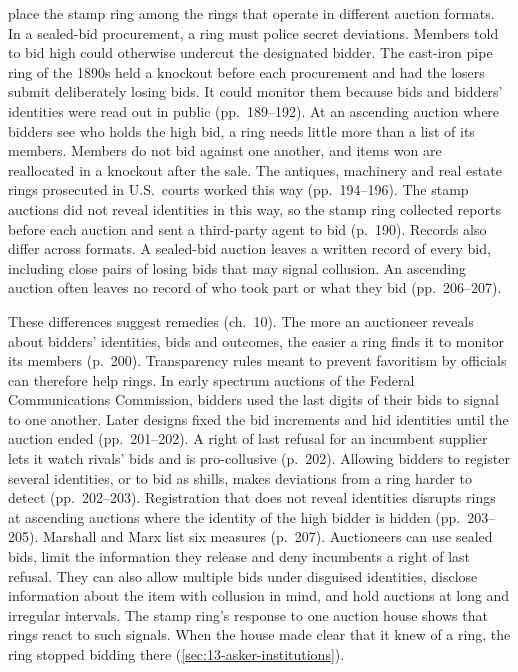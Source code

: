 \citet[chs.~9--10]{MarshallMarx2012} place the stamp ring among the rings that operate in different auction
formats. In a sealed-bid procurement, a ring must police secret deviations. Members told to bid high could
otherwise undercut the designated bidder. The cast-iron pipe ring of the 1890s held a knockout before each
procurement and had the losers submit deliberately losing bids. It could monitor them because bids and bidders'
identities were read out in public (pp.~189--192). At an ascending auction where bidders see who holds the high
bid, a ring needs little more than a list of its members. Members do not bid against one another, and items won are
reallocated in a knockout after the sale. The antiques, machinery and real estate rings prosecuted in U.S.\ courts
worked this way (pp.~194--196). The stamp auctions did not reveal identities in this way, so the stamp ring collected
reports before each auction and sent a third-party agent to bid (p.~190). Records also differ across formats. A
sealed-bid auction leaves a written record of every bid, including close pairs of losing bids that may signal
collusion. An ascending auction often leaves no record of who took part or what they bid (pp.~206--207).

These differences suggest remedies (ch.~10). The more an auctioneer reveals about bidders' identities, bids and
outcomes, the easier a ring finds it to monitor its members (p.~200). Transparency rules meant to prevent
favoritism by officials can therefore help rings. In early spectrum auctions of the Federal Communications
Commission, bidders used the last digits of their bids to signal to one another. Later designs fixed the bid
increments and hid identities until the auction ended (pp.~201--202). A right of last refusal for an incumbent
supplier lets it watch rivals' bids and is pro-collusive (p.~202). Allowing bidders to register several
identities, or to bid as shills, makes deviations from a ring harder to detect (pp.~202--203). Registration that does not reveal
identities disrupts rings at ascending auctions where the identity of the high bidder is hidden (pp.~203--205).
Marshall and Marx list six measures (p.~207). Auctioneers can use sealed bids, limit the information they release
and deny incumbents a right of last refusal. They can also allow multiple bids under disguised identities, disclose
information about the item with collusion in mind, and hold auctions at long and irregular intervals. The stamp
ring's response to one auction house shows that rings react to such signals. When the house made clear that it
knew of a ring, the ring stopped bidding there (\cref{sec:13-asker-institutions}).

